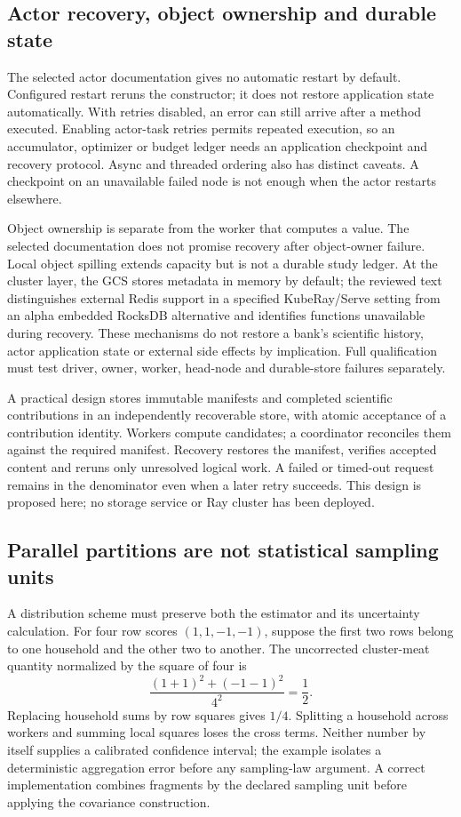 \subsection{Actor recovery, object ownership and durable state}
The selected actor documentation gives no automatic restart by default. Configured restart reruns the constructor; it does not restore application state automatically. With retries disabled, an error can still arrive after a method executed. Enabling actor-task retries permits repeated execution, so an accumulator, optimizer or budget ledger needs an application checkpoint and recovery protocol. Async and threaded ordering also has distinct caveats. A checkpoint on an unavailable failed node is not enough when the actor restarts elsewhere.\citep{exec24_ray_sources}

Object ownership is separate from the worker that computes a value. The selected documentation does not promise recovery after object-owner failure. Local object spilling extends capacity but is not a durable study ledger. At the cluster layer, the GCS stores metadata in memory by default; the reviewed text distinguishes external Redis support in a specified KubeRay/Serve setting from an alpha embedded RocksDB alternative and identifies functions unavailable during recovery. These mechanisms do not restore a bank's scientific history, actor application state or external side effects by implication. Full qualification must test driver, owner, worker, head-node and durable-store failures separately.\citep{exec24_ray_sources}

A practical design stores immutable manifests and completed scientific contributions in an independently recoverable store, with atomic acceptance of a contribution identity. Workers compute candidates; a coordinator reconciles them against the required manifest. Recovery restores the manifest, verifies accepted content and reruns only unresolved logical work. A failed or timed-out request remains in the denominator even when a later retry succeeds. This design is proposed here; no storage service or Ray cluster has been deployed.\citep{exec24_ray_contract}

\subsection{Parallel partitions are not statistical sampling units}
A distribution scheme must preserve both the estimator and its uncertainty calculation. For four row scores $(1,1,-1,-1)$, suppose the first two rows belong to one household and the other two to another. The uncorrected cluster-meat quantity normalized by the square of four is
\[
 \frac{(1+1)^2+(-1-1)^2}{4^2}=\frac12.
\]
Replacing household sums by row squares gives $1/4$. Splitting a household across workers and summing local squares loses the cross terms. Neither number by itself supplies a calibrated confidence interval; the example isolates a deterministic aggregation error before any sampling-law argument. A correct implementation combines fragments by the declared sampling unit before applying the covariance construction.\citep{exec24_ray_contract}

